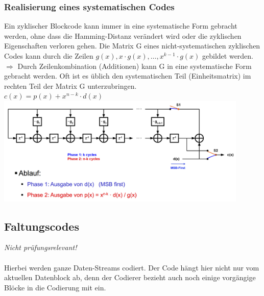 \subsubsection{Realisierung eines systematischen Codes}
Ein zyklischer Blockcode kann immer in eine systematische Form gebracht werden, ohne dass die
Hamming-Distanz verändert wird oder die zyklischen Eigenschaften verloren gehen.
Die Matrix G eines nicht-systematischen zyklischen Codes kann durch die Zeilen $g(x), x\cdot g(x), \ldots, x^{k-1}\cdot g(x)$ gebildet werden. 
$\Rightarrow$ Durch Zeilenkombination (Additionen) kann G in eine systematische Form gebracht werden. Oft ist es üblich den systematischen Teil (Einheitsmatrix) im rechten Teil der Matrix G unterzubringen.\\
\hspace*{0.5cm}$ c(x) = p(x) + x^{n-k}\cdot d(x)$\\
\includegraphics[width = 12cm]{./bilder/11_cyc_hw_imp_sys_code}

\subsection{Faltungscodes}
\textit{Nicht prüfungsrelevant!}\\ \\
Hierbei werden ganze Daten-Streams codiert. Der Code hängt hier nicht nur vom aktuellen Datenblock
ab, denn der Codierer bezieht auch noch einige vorgängige Blöcke in die Codierung mit ein.
